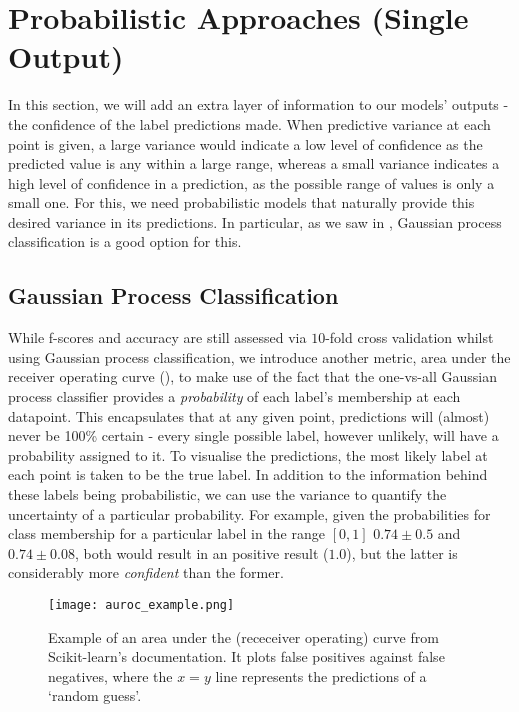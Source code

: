\section{Probabilistic Approaches (Single Output)}

In this section, we will add an extra layer of information to our models' outputs - the confidence of the label predictions made. When predictive variance at each point is given, a large variance would indicate a low level of confidence as the predicted value is any within a large range, whereas a small variance indicates a high level of confidence in a prediction, as the possible range of values is only a small one. For this, we need probabilistic models that naturally provide this desired variance in its predictions. In particular, as we saw in , Gaussian process classification is a good option for this.

\subsection{Gaussian Process Classification}

While f-scores and accuracy are still assessed via $10$-fold cross validation whilst using Gaussian process classification, we introduce another metric, area under the receiver operating curve (), to make use of the fact that the one-vs-all Gaussian process classifier provides a \textit{probability} of each label's membership at each datapoint. This encapsulates that at any given point, predictions will (almost) never be 100\% certain - every single possible label, however unlikely, will have a probability assigned to it. To visualise the predictions, the most likely label at each point is taken to be the true label. In addition to the information behind these labels being probabilistic, we can use the variance to quantify the uncertainty of a particular probability. For example, given the probabilities for class membership for a particular label in the range $[0,1]$ $0.74 \pm 0.5$ and $0.74 \pm 0.08$, both would result in an positive result ($1.0$), but the latter is considerably more \textit{confident} than the former.

\begin{figure}
    \centerline{\texttt{[image: auroc\_example.png]}}
    \caption{Example of an area under the (receceiver operating) curve from Scikit-learn's documentation. It plots false positives against false negatives, where the $x=y$ line represents the predictions of a `random guess'.}
\end{figure}

